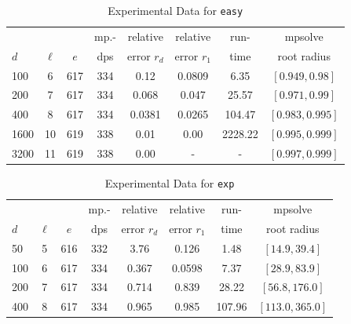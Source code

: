 \documentclass[runningheads]{llncs}
\begin{document}
\begin{table}
\caption{Experimental Data for \texttt{easy}} %
\label{tab:easy}
\vskip -0.15in
\begin{center}
\begin{small}
\begin{sc}
\begin{tabular}{lccccccc}
\toprule
&  &  & mp.-& relative  & relative & run- & mpsolve \\
$d$& $\ell$& $e$ & dps&error $r_d$       & error $r_1$ &time& root radius\\
\midrule
 100 & 6 & 617 & 334 & 0.12 & 0.0809 & 6.35 & $[0.949, 0.98]$\\
 200 & 7 & 617 & 334 & 0.068 & 0.047 & 25.57 & $[0.971, 0.99]$\\
 400 & 8 & 617 & 334 & 0.0381 & 0.0265 & 104.47 & $[0.983, 0.995]$\\
 1600 &10& 619 & 338 & 0.01 & 0.00 & 2228.22 & $[0.995, 0.999]$\\ %
  3200 &11& 619 & 338 & 0.00 & - & - & $[0.997, 0.999]$\\ %
\bottomrule
\end{tabular}
\end{sc}
\end{small}
\end{center}
\vskip 0.05in
\end{table}


\begin{table}
\caption{Experimental Data for \texttt{exp}} %
\label{tab:exp}
\vskip -0.15in
\begin{center}
\begin{small}
\begin{sc}
\begin{tabular}{lccccccc}
\toprule
&  &  & mp.-& relative  & relative & run- & mpsolve \\
$d$& $\ell$& $e$ & dps&error $r_d$       & error $r_1$ &time& root radius\\
\midrule
 50 & 5 & 616 & 332 & 3.76 & 0.126 & 1.48 & $[14.9, 39.4]$\\
100 & 6 & 617 & 334 & 0.367 & 0.0598 & 7.37 & $[28.9, 83.9]$\\
 200 & 7 & 617 & 334 & 0.714 & 0.839 & 28.22 & $[56.8, 176.0]$\\
 400 & 8 & 617 & 334 & 0.965 & 0.985 & 107.96 & $[113.0, 365.0]$\\
\bottomrule
\end{tabular}
\end{sc}
\end{small}
\end{center}
\vskip 0.05in
\end{table}
\end{document}
